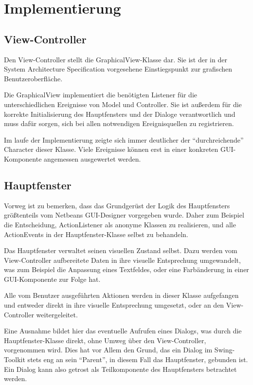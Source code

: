 \chapter{Implementierung}

    \section{View-Controller}
    
        Den View-Controller stellt die GraphicalView-Klasse dar. Sie ist der in
        der System Architecture Specification vorgesehene Einstiegspunkt zur
        grafischen Benutzeroberfläche.
        
        Die GraphicalView implementiert die benötigten Listener für die
        unterschiedlichen Ereignisse von Model und Controller. Sie ist außerdem für die korrekte
        Initialisierung des Hauptfensters und der Dialoge verantwortlich und
        muss dafür sorgen, sich bei allen notwendigen Ereignisquellen zu
        registrieren.
        
        Im laufe der Implementierung zeigte sich immer deutlicher der
        "`durchreichende"' Character dieser Klasse. Viele Ereignisse können erst
        in einer konkreten GUI-Komponente angemessen ausgewertet werden.
    
    \section{Hauptfenster}
    
        Vorweg ist zu bemerken, dass das Grundgerüst der Logik des Hauptfensters
        größtenteils vom Netbeans GUI-Designer vorgegeben wurde. Daher zum
        Beispiel die Entscheidung, ActionListener als anonyme Klassen zu
        realisieren, und alle ActionEvents in der Hauptfenster-Klasse selbst zu
        behandeln.
        
        Das Hauptfenster verwaltet seinen visuellen Zustand selbst. Dazu werden
        vom View-Controller aufbereitete Daten in ihre visuelle Entsprechung
        umgewandelt, was zum Beispiel die Anpassung eines Textfeldes, oder eine
        Farbänderung in einer GUI-Komponente zur Folge hat.
        
        Alle vom Benutzer ausgeführten Aktionen werden in dieser Klasse
        aufgefangen und entweder direkt in ihre visuelle Entsprechung umgesetzt,
        oder an den View-Controller weitergeleitet.
        
        Eine Ausnahme bildet hier das eventuelle Aufrufen eines Dialogs, was
        durch die Hauptfenster-Klasse direkt, ohne Umweg über den
        View-Controller, vorgenommen wird. Dies hat vor Allem den Grund, das ein
        Dialog im Swing-Toolkit stets eng an sein "`Parent"', in diesem Fall das
        Hauptfenster, gebunden ist. Ein Dialog kann also getrost als
        Teilkomponente des Hauptfensters betrachtet werden.
    
